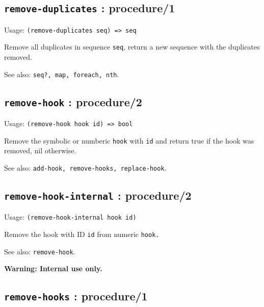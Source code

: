 \documentclass[
]{article}
\newcommand{\passthrough}[1]{#1}
\begin{document}
\hypertarget{remove-duplicates-procedure1-1}{%
\subsection{\texorpdfstring{\texttt{remove-duplicates} :
procedure/1}{remove-duplicates : procedure/1}}\label{remove-duplicates-procedure1-1}}

Usage: \passthrough{\lstinline!(remove-duplicates seq) => seq!}

Remove all duplicates in sequence \passthrough{\lstinline!seq!}, return
a new sequence with the duplicates removed.

See also: \passthrough{\lstinline!seq?, map, foreach, nth!}.

\hypertarget{remove-hook-procedure2-1}{%
\subsection{\texorpdfstring{\texttt{remove-hook} :
procedure/2}{remove-hook : procedure/2}}\label{remove-hook-procedure2-1}}

Usage: \passthrough{\lstinline!(remove-hook hook id) => bool!}

Remove the symbolic or numberic \passthrough{\lstinline!hook!} with
\passthrough{\lstinline!id!} and return true if the hook was removed,
nil otherwise.

See also:
\passthrough{\lstinline!add-hook, remove-hooks, replace-hook!}.

\hypertarget{remove-hook-internal-procedure2-1}{%
\subsection{\texorpdfstring{\texttt{remove-hook-internal} :
procedure/2}{remove-hook-internal : procedure/2}}\label{remove-hook-internal-procedure2-1}}

Usage: \passthrough{\lstinline!(remove-hook-internal hook id)!}

Remove the hook with ID \passthrough{\lstinline!id!} from numeric
\passthrough{\lstinline!hook.!}

See also: \passthrough{\lstinline!remove-hook!}.

\textbf{Warning: Internal use only.}

\hypertarget{remove-hooks-procedure1-1}{%
\subsection{\texorpdfstring{\texttt{remove-hooks} :
procedure/1}{remove-hooks : procedure/1}}\label{remove-hooks-procedure1-1}}
\end{document}
